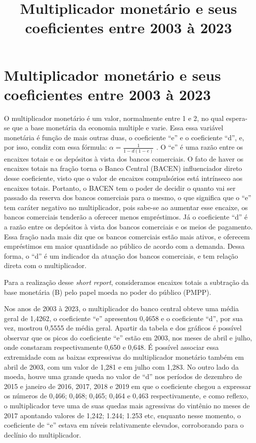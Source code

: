 \documentclass[12pt]{article}
\date{} %
\title{Multiplicador monetário e seus coeficientes entre 2003 à 2023}
\begin{document}
\section*{Multiplicador monetário e seus coeficientes entre 2003 à 2023}

O multiplicador monetário é um valor, normalmente entre 1 e 2, no qual
espera-se que a base monetária da economia multiple e varie. Essa essa
variável monetária é função de mais outras duas, o coeficiente ``e'' e o
coeficiente ``d'', e, por isso, condiz com essa fórmula:
\(\alpha = \frac{1}{1-d(1-e)}\) . O ``e'' é uma razão entre os encaixes
totais e os depósitos à vista dos bancos comerciais. O fato de haver os
encaixes totais na fração torna o Banco Central (BACEN) influenciador
direto desse coeficiente, visto que o valor de encaixes compulsórios
está intrínseco aos encaixes totais. Portanto, o BACEN tem o poder de
decidir o quanto vai ser passado da reserva dos bancos comerciais para o
mesmo, o que significa que o ``e'' tem caráter negativo no
multiplicador, pois sabe-se ao aumentar esse encaixe, os bancos
comerciais tenderão a oferecer menos empréstimos. Já o coeficiente ``d''
é a razão entre os depósitos à vista dos bancos comerciais e os meios de
pagamento. Essa fração nada mais diz que os bancos comerciais estão mais
ativos, e oferecem empréstimos em maior quantidade ao público de acordo
com a demanda. Dessa forma, o ``d'' é um indicador da atuação dos bancos
comerciais, e tem relação direta com o multiplicador.

Para a realização desse \textit{short report}, consideramos encaixes
totais a subtração da base monetária (B) pelo papel moeda no poder do
público (PMPP).

Nos anos de 2003 à 2023, o multiplicador do banco central obteve uma
média geral de 1,4262, o coeficiente ``e'' apresentou 0,4658 e o
coeficiente ``d'', por sua vez, mostrou 0,5555 de média geral. Apartir
da tabela e dos gráficos é possível observar que os picos do coeficiente
``e'' estão em 2003, nos meses de abril e julho, onde constaram
respectivamente 0,650 e 0,648. É possível associar essa extremidade com
as baixas expressivas do multiplicador monetário também em abril de
2003, com um valor de 1,281 e em julho com 1,283. No outro lado da
moeda, houve uma grande queda no valor de ``d'' nos períodos de dezembro
de 2015 e janeiro de 2016, 2017, 2018 e 2019 em que o coeficiente chegou
a expressar os números de 0,466; 0,468; 0,465; 0,464 e 0,463
respectivamente, e como reflexo, o multiplicador teve uma de suas quedas
mais agressivas do vintênio no meses de 2017 apontando valores de 1,242;
1.244; 1.253 etc, enquanto nesse momento, o coeficiente de ``e'' estava
em níveis relativamente elevados, corroborando para o declínio do
multiplicador.
\end{document}
